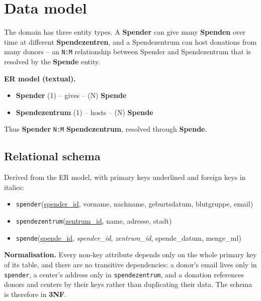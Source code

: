 \documentclass[11pt,a4paper]{article}
\begin{document}
\section{Data model}

The domain has three entity types. A \textbf{Spender} can give many
\textbf{Spenden} over time at different \textbf{Spendezentren}, and a
Spendezentrum can host donations from many donors -- an \texttt{N:M}
relationship between Spender and Spendezentrum that is resolved by the
\textbf{Spende} entity.

\begin{beispielbox}
\textbf{ER model (textual).}
\begin{itemize}[leftmargin=1.4em, topsep=2pt]
  \item \textbf{Spender} (1) \;--\; gives \;--\; (N) \textbf{Spende}
  \item \textbf{Spendezentrum} (1) \;--\; hosts \;--\; (N) \textbf{Spende}
\end{itemize}
Thus \textbf{Spender} \texttt{N:M} \textbf{Spendezentrum}, resolved through
\textbf{Spende}.
\end{beispielbox}

\subsection{Relational schema}

Derived from the ER model, with primary keys underlined and foreign keys in
italics:

\begin{itemize}[leftmargin=1.4em]
  \item \texttt{spender}(\underline{spender\_id}, vorname, nachname,
        geburtsdatum, blutgruppe, email)
  \item \texttt{spendezentrum}(\underline{zentrum\_id}, name, adresse, stadt)
  \item \texttt{spende}(\underline{spende\_id}, \emph{spender\_id},
        \emph{zentrum\_id}, spende\_datum, menge\_ml)
\end{itemize}

\textbf{Normalisation.} Every non-key attribute depends only on the whole
primary key of its table, and there are no transitive dependencies: a donor's
email lives only in \texttt{spender}, a center's address only in
\texttt{spendezentrum}, and a donation references donors and centers by their
keys rather than duplicating their data. The schema is therefore in
\textbf{3NF}.
\end{document}
